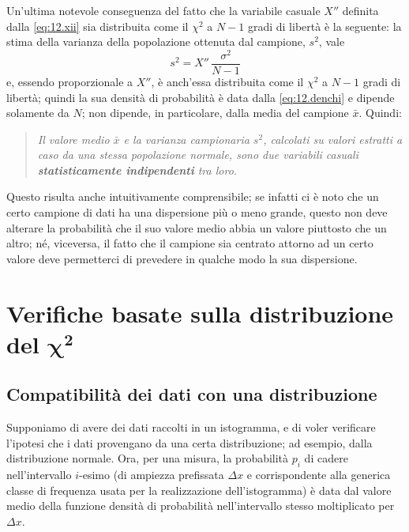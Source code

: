 Un'ultima notevole conseguenza del fatto che la variabile
casuale $X''$ definita dalla \eqref{eq:12.xii} sia
distribuita come il $\chi^2$ a $N - 1$ gradi di libert\`a
\`e la seguente: la stima della varianza della popolazione
ottenuta dal campione, $s^2$, vale
\begin{equation} \label{eq:12.xiis2}
  s^2 = X'' \, \frac{\sigma^2}{N-1}
\end{equation}
e, essendo proporzionale a $X''$, \`e anch'essa distribuita
come il $\chi^2$ a $N - 1$ gradi di libert\`a; quindi la sua
densit\`a di probabilit\`a \`e data dalla
\eqref{eq:12.denchi} e dipende solamente da $N$; non
dipende, in particolare, dalla media del campione $\bar x$.
Quindi:
\begin{quote}
  \label{th:12.inmest}
  \textit{Il valore medio $\bar x$ e la varianza campionaria
    $s^2$, calcolati su valori estratti a caso da una stessa
    popolazione normale, sono due variabili casuali
    \textbf{statisticamente indipendenti} tra loro.}
\end{quote}%

Questo risulta anche intuitivamente comprensibile; se
infatti ci \`e noto che un certo campione di dati ha una
dispersione pi\`u o meno grande, questo non deve alterare la
probabilit\`a che il suo valore medio abbia un valore
piuttosto che un altro; n\'e, viceversa, il fatto che il
campione sia centrato attorno ad un certo valore deve
permetterci di prevedere in qualche modo la sua dispersione.

\section[Verifiche basate sulla distribuzione del $\chi^2$]
{Verifiche basate sulla distribuzione del
  $\boldsymbol{\chi}^{\boldsymbol{2}}$}
\subsection{Compatibilit\`a dei dati con una distribuzione}%
%
\label{ch:12.comdadis}
Supponiamo di avere dei dati raccolti in un istogramma, e di
voler verificare l'ipotesi che i dati provengano da una
certa distribuzione; ad esempio, dalla distribuzione
normale.  Ora, per una misura, la probabilit\`a $p_i$ di
cadere nell'intervallo $i$-esimo (di ampiezza prefissata
$\Delta x$ e corrispondente alla generica classe di
frequenza usata per la realizzazione dell'istogramma) \`e
data dal valore medio della funzione densit\`a di
probabilit\`a nell'intervallo stesso moltiplicato per
$\Delta x$.

